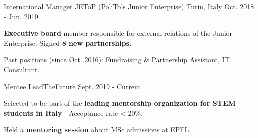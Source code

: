 

\begin{cventries}

  \cventry
    {International Manager} %
    {JEToP (PoliTo's Junior Enterprise)} %
    {Turin, Italy} %
    {Oct. 2018 - Jun. 2019} %
    {
      \begin{cvitems} %
        \item {\textbf{Executive board} member responsible for external relations of the Junior Enterprise. Signed \textbf{8 new partnerships.}}
        \item {Past positions (since Oct. 2016): Fundraising \& Partnership Assistant, IT Consultant.}
      \end{cvitems}
    }
  \cventry
    {Mentee} %
    {LeadTheFuture} %
    {} %
    {Sept. 2019 - Current} %
    {
      \begin{cvitems} %
        \item {Selected to be part of the \textbf{leading mentorship organization for STEM students in Italy} - Acceptance rate < 20\%.}
        \item {Held a \textbf{mentoring session} about MSc admissions at EPFL.}
      \end{cvitems}
    }
\end{cventries}
